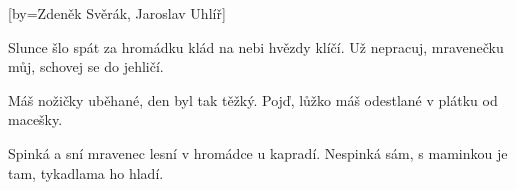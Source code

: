 [by={Zdeněk Svěrák, Jaroslav Uhlíř}]

\beginverse{}
Slunce šlo spát
za hromádku klád
na nebi hvězdy klíčí.
Už nepracuj, mravenečku můj,
schovej se do jehličí.
\endverse{}

\beginchorus{}
Máš nožičky uběhané,
den byl tak těžký.
Pojď, lůžko máš odestlané
v plátku od macešky.
\endchorus{}

\beginverse{}
Spinká a sní
mravenec lesní
v hromádce u kapradí. 
Nespinká sám, s maminkou je tam,
tykadlama ho hladí.
\endverse{}

\beginchorus{}
\phantom{}
\endchorus{}

\endsong{}
